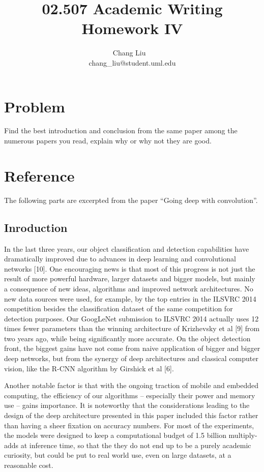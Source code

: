 \documentclass{article}
\title{02.507 Academic Writing Homework IV}
\author{Chang Liu ~\\ chang\_liu@student.uml.edu}
\begin{document}
\maketitle

\section{Problem}

Find the best introduction and conclusion from the same paper among the numerous papers you read, explain why or why not they are good.


\section{Reference}

The following parts are excerpted from the paper ``Going deep with convolution''.

\subsection{Inroduction}

In the last three years, our object classification and detection
capabilities have dramatically improved due to advances
in deep learning and convolutional networks [10].
One encouraging news is that most of this progress is not
just the result of more powerful hardware, larger datasets
and bigger models, but mainly a consequence of new ideas,
algorithms and improved network architectures. No new
data sources were used, for example, by the top entries
in the ILSVRC 2014 competition besides the classification
dataset of the same competition for detection purposes. Our
GoogLeNet submission to ILSVRC 2014 actually uses 12
times fewer parameters than the winning architecture of
Krizhevsky et al [9] from two years ago, while being significantly
more accurate. On the object detection front, the
biggest gains have not come from naive application of bigger 
and bigger deep networks, but from the synergy of deep
architectures and classical computer vision, like the R-CNN
algorithm by Girshick et al [6].


Another notable factor is that with the ongoing traction
of mobile and embedded computing, the efficiency of our
algorithms – especially their power and memory use – gains
importance. It is noteworthy that the considerations leading
to the design of the deep architecture presented in this paper
included this factor rather than having a sheer fixation on
accuracy numbers. For most of the experiments, the models
were designed to keep a computational budget of 1.5 billion
multiply-adds at inference time, so that the they do not end
up to be a purely academic curiosity, but could be put to real
world use, even on large datasets, at a reasonable cost.
\end{document}
